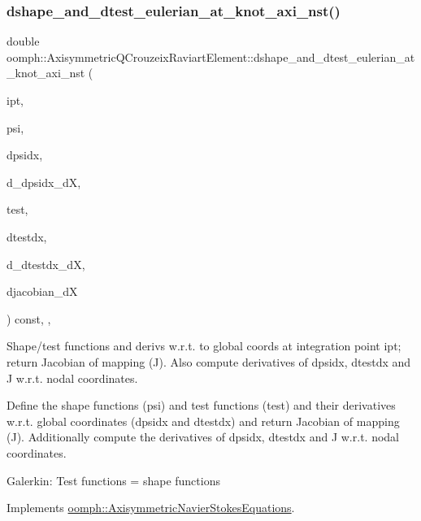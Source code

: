 \subsubsection{\texorpdfstring{dshape\+\_\+and\+\_\+dtest\+\_\+eulerian\+\_\+at\+\_\+knot\+\_\+axi\+\_\+nst()}{dshape\_and\_dtest\_eulerian\_at\_knot\_axi\_nst()}\hspace{0.1cm}{\footnotesize\ttfamily [2/2]}}
{\footnotesize\ttfamily double oomph\+::\+Axisymmetric\+Q\+Crouzeix\+Raviart\+Element\+::dshape\+\_\+and\+\_\+dtest\+\_\+eulerian\+\_\+at\+\_\+knot\+\_\+axi\+\_\+nst (\begin{DoxyParamCaption}\item[{const unsigned \&}]{ipt,  }\item[{\hyperlink{classoomph_1_1Shape}{Shape} \&}]{psi,  }\item[{\hyperlink{classoomph_1_1DShape}{D\+Shape} \&}]{dpsidx,  }\item[{\hyperlink{classoomph_1_1RankFourTensor}{Rank\+Four\+Tensor}$<$ double $>$ \&}]{d\+\_\+dpsidx\+\_\+dX,  }\item[{\hyperlink{classoomph_1_1Shape}{Shape} \&}]{test,  }\item[{\hyperlink{classoomph_1_1DShape}{D\+Shape} \&}]{dtestdx,  }\item[{\hyperlink{classoomph_1_1RankFourTensor}{Rank\+Four\+Tensor}$<$ double $>$ \&}]{d\+\_\+dtestdx\+\_\+dX,  }\item[{\hyperlink{classoomph_1_1DenseMatrix}{Dense\+Matrix}$<$ double $>$ \&}]{djacobian\+\_\+dX }\end{DoxyParamCaption}) const\hspace{0.3cm}{\ttfamily [inline]}, {\ttfamily [protected]}, {\ttfamily [virtual]}}



Shape/test functions and derivs w.\+r.\+t. to global coords at integration point ipt; return Jacobian of mapping (J). Also compute derivatives of dpsidx, dtestdx and J w.\+r.\+t. nodal coordinates. 

Define the shape functions (psi) and test functions (test) and their derivatives w.\+r.\+t. global coordinates (dpsidx and dtestdx) and return Jacobian of mapping (J). Additionally compute the derivatives of dpsidx, dtestdx and J w.\+r.\+t. nodal coordinates.

Galerkin\+: Test functions = shape functions 

Implements \hyperlink{classoomph_1_1AxisymmetricNavierStokesEquations_a2cd0715a679af81bd0e3d7448a5560cb}{oomph\+::\+Axisymmetric\+Navier\+Stokes\+Equations}.



